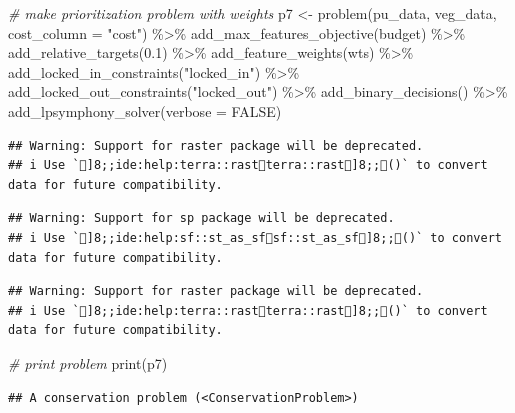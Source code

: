 \documentclass[
  12pt,
]{book}
\newenvironment{Shaded}{\begin{snugshade}}{\end{snugshade}}
\newcommand{\AttributeTok}[1]{\textcolor[rgb]{0.77,0.63,0.00}{#1}}
\newcommand{\CommentTok}[1]{\textcolor[rgb]{0.56,0.35,0.01}{\textit{#1}}}
\newcommand{\ConstantTok}[1]{\textcolor[rgb]{0.00,0.00,0.00}{#1}}
\newcommand{\FloatTok}[1]{\textcolor[rgb]{0.00,0.00,0.81}{#1}}
\newcommand{\FunctionTok}[1]{\textcolor[rgb]{0.00,0.00,0.00}{#1}}
\newcommand{\NormalTok}[1]{#1}
\newcommand{\OtherTok}[1]{\textcolor[rgb]{0.56,0.35,0.01}{#1}}
\newcommand{\SpecialCharTok}[1]{\textcolor[rgb]{0.00,0.00,0.00}{#1}}
\newcommand{\StringTok}[1]{\textcolor[rgb]{0.31,0.60,0.02}{#1}}
\begin{document}
\begin{Shaded}
\begin{Highlighting}[]
\CommentTok{\# make prioritization problem with weights}
\NormalTok{p7 }\OtherTok{\textless{}{-}} \FunctionTok{problem}\NormalTok{(pu\_data, veg\_data, }\AttributeTok{cost\_column =} \StringTok{"cost"}\NormalTok{) }\SpecialCharTok{\%\textgreater{}\%}
      \FunctionTok{add\_max\_features\_objective}\NormalTok{(budget) }\SpecialCharTok{\%\textgreater{}\%}
      \FunctionTok{add\_relative\_targets}\NormalTok{(}\FloatTok{0.1}\NormalTok{) }\SpecialCharTok{\%\textgreater{}\%}
      \FunctionTok{add\_feature\_weights}\NormalTok{(wts) }\SpecialCharTok{\%\textgreater{}\%}
      \FunctionTok{add\_locked\_in\_constraints}\NormalTok{(}\StringTok{"locked\_in"}\NormalTok{) }\SpecialCharTok{\%\textgreater{}\%}
      \FunctionTok{add\_locked\_out\_constraints}\NormalTok{(}\StringTok{"locked\_out"}\NormalTok{) }\SpecialCharTok{\%\textgreater{}\%}
      \FunctionTok{add\_binary\_decisions}\NormalTok{() }\SpecialCharTok{\%\textgreater{}\%}
      \FunctionTok{add\_lpsymphony\_solver}\NormalTok{(}\AttributeTok{verbose =} \ConstantTok{FALSE}\NormalTok{)}
\end{Highlighting}
\end{Shaded}

\begin{verbatim}
## Warning: Support for raster package will be deprecated.
## i Use `]8;;ide:help:terra::rastterra::rast]8;;()` to convert data for future compatibility.
\end{verbatim}

\begin{verbatim}
## Warning: Support for sp package will be deprecated.
## i Use `]8;;ide:help:sf::st_as_sfsf::st_as_sf]8;;()` to convert data for future compatibility.
\end{verbatim}

\begin{verbatim}
## Warning: Support for raster package will be deprecated.
## i Use `]8;;ide:help:terra::rastterra::rast]8;;()` to convert data for future compatibility.
\end{verbatim}

\begin{Shaded}
\begin{Highlighting}[]
\CommentTok{\# print problem}
\FunctionTok{print}\NormalTok{(p7)}
\end{Highlighting}
\end{Shaded}

\begin{verbatim}
## A conservation problem (<ConservationProblem>)
\end{verbatim}
\end{document}
